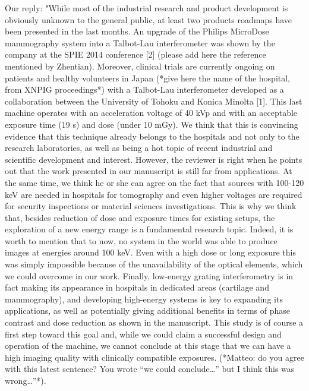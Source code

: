 \documentclass[a4paper,english]{scrartcl} \usepackage[detect-all]{siunitx}
\begin{document}
Our reply: "While most of the industrial research and product development is
obviously unknown to the general public, at least two products roadmaps have
been presented in the last months. An upgrade of the Philips MicroDose
mammography system into a Talbot-Lau interferometer was shown by the company
at the SPIE 2014 conference [2] (please add here the reference mentioned by
Zhentian). Moreover, clinical trials are currently ongoing on patients and
healthy volunteers in Japan (*give here the name of the hospital, from XNPIG
proceedings*) with a Talbot-Lau interferometer developed as a collaboration
between the University of Tohoku and Konica Minolta [1]. This last machine
operates with an acceleration voltage of 40 kVp and with an acceptable
exposure time (19 s) and dose (under 10 mGy). We think that this is
convincing evidence that this technique already belongs to the hospitals and
not only to the research laboratories, as well as being a hot topic of
recent industrial and scientific development and interest. However, the
reviewer is right when he points out that the work presented in our
manuscript is still far from applications. At the same time, we think he or
she can agree on the fact that sources with 100-120 keV are needed in
hospitals for tomography and even higher voltages are required for security
inspections or material sciences investigations. This is why we think that,
besides reduction of dose and exposure times for existing setups, the
exploration of a new energy range is a fundamental research topic. Indeed,
it is worth to mention that to now, no system in the world was able to
produce images at energies around 100 keV. Even with a high dose or long
exposure this was simply impossible because of the unavailability of the
optical elements, which we could overcome in our work. Finally, low-energy
grating interferometry is in fact making its appearance in hospitals in
dedicated areas (cartilage and mammography), and developing high-energy
systems is key to expanding its applications, as well as potentially giving
additional benefits in terms of phase contrast and dose reduction as shown
in the manuscript. This study is of course a first step toward this goal
and, while we could claim a successful design and operation of the machine,
we cannot conclude at this stage that we can have a high imaging quality
with clinically compatible exposures. (*Matteo: do you agree with this
latest sentence? You wrote “we could conclude…” but I think this was
wrong…”*).
\end{document}
